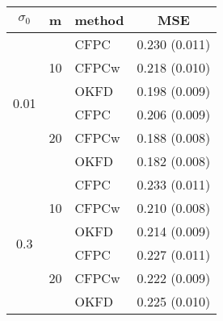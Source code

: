 


\begin{table}
	\begin{center}
		\begin{tabular}
			{|c|c|l|c|} \hline $\sigma_0$ & m & method & MSE \\
			\hline \multirow{6}{*}{0.01}& \multirow{3}{*}{10}
			  &CFPC&  0.230  (0.011)  \\
			& &CFPCw& 0.218  (0.010)  \\
			& &OKFD& 0.198  (0.009) \\
			\cline{2-4} & \multirow{3}{*}{20}
			  &CFPC& 0.206  (0.009) \\
			& &CFPCw&  0.188  (0.008)  \\
			& &OKFD& 0.182  (0.008)  \\
			\hline \multirow{6}{*}{0.3}& \multirow{3}{*}{10}
			  &CFPC& 0.233  (0.011)   \\
			& &CFPCw& 0.210  (0.008) \\
			& &OKFD& 0.214  (0.009)  \\
			\cline{2-4} & \multirow{3}{*}{20}
			  &CFPC& 0.227  (0.011)  \\
			& &CFPCw& 0.222  (0.009)  \\
			& &OKFD& 0.225  (0.010)  \\
			\hline
		\end{tabular}
	\label{tab:kriging_pred}
	\end{center}
\end{table}

